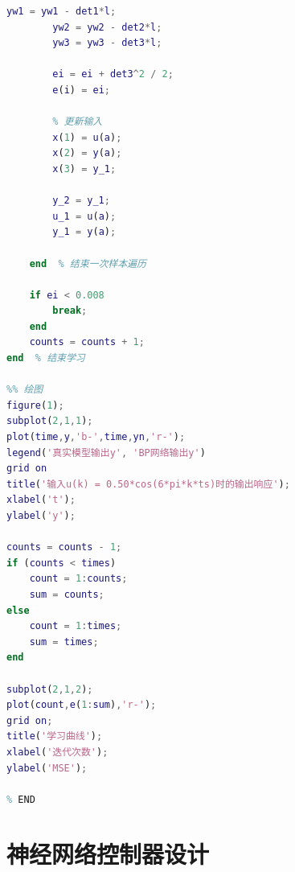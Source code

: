 \documentclass{article}
\begin{document}
\begin{lstlisting}[caption=ex1\_bp.m, language=matlab]
        yw1 = yw1 - det1*l;
        yw2 = yw2 - det2*l;
        yw3 = yw3 - det3*l;
        
        ei = ei + det3^2 / 2;
        e(i) = ei;
        
        % 更新输入
        x(1) = u(a);
        x(2) = y(a);
        x(3) = y_1;
        
        y_2 = y_1;
        u_1 = u(a);
        y_1 = y(a);
        
    end  % 结束一次样本遍历
    
    if ei < 0.008
        break;
    end
    counts = counts + 1;
end  % 结束学习

%% 绘图
figure(1);
subplot(2,1,1);
plot(time,y,'b-',time,yn,'r-');
legend('真实模型输出y', 'BP网络输出y')
grid on
title('输入u(k) = 0.50*cos(6*pi*k*ts)时的输出响应');
xlabel('t');
ylabel('y');

counts = counts - 1;
if (counts < times)
    count = 1:counts;
    sum = counts;
else
    count = 1:times;
    sum = times;
end

subplot(2,1,2);
plot(count,e(1:sum),'r-');
grid on;
title('学习曲线');
xlabel('迭代次数');
ylabel('MSE');

% END
\end{lstlisting}


\section{神经网络控制器设计}
\end{document}
